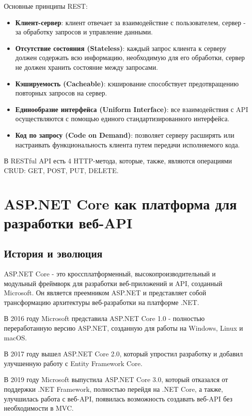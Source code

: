 \documentclass[a4paper,12pt]{report}
\begin{document}
Основные принципы \acs{REST}:
\begin{itemize}
    \item
        \textbf{Клиент-сервер}: клиент отвечает за взаимодействие с пользователем, сервер - за обработку запросов и управление данными.
    \item 
        \textbf{Отсутствие состояния (Stateless)}: каждый запрос клиента к серверу должен содержать всю информацию, необходимую для его обработки, 
        сервер не должен хранить состояние между запросами.
    \item
        \textbf{Кэшируемость (Cacheable)}: кэширование способствует предотвращению повторных запросов на сервер.
    \item
        \textbf{Единообразие интерфейса (Uniform Interface)}: все взаимодействия с API осуществляются с помощью единого стандартизированного интерфейса.
    \item
        \textbf{Код по запросу (Code on Demand)}: позволяет серверу расширять или настраивать функциональность клиента путем передачи исполняемого кода.
\end{itemize}

В \acs{REST}ful \acs{API} есть 4 \acs{HTTP}-метода, которые, также, являются операциями \acs{CRUD}: GET, POST, PUT, DELETE.

\section{ASP.NET Core как платформа для разработки веб-\acs{API}}

\subsection{История и эволюция}
ASP.NET Core - это кроссплатформенный, высокопроизводительный и модульный фреймворк для разработки веб-приложений и \acs{API}, созданный Microsoft. 
Он является преемником ASP.NET и представляет собой трансформацию архитектуры веб-разработки на платформе .NET.

В 2016 году Microsoft представила ASP.NET Core 1.0 - полностью переработанную версию ASP.NET, созданную для работы на Windows, Linux и macOS.\cite{announcing_asp_net_core_1_0}

В 2017 году вышел ASP.NET Core 2.0, который упростил разработку и добавил улучшенную работу с Entity Framework Core.\cite{announcing_asp_net_core_2_0}

В 2019 году Microsoft выпустила ASP.NET Core 3.0, который отказался от поддержки .NET Framework, полностью перейдя на .NET Core, 
а также, улучшилась работа с веб-\acs{API}, появилась возможность создавать веб-\acs{API} без необходимости в \acs{MVC}.\cite{announcing_asp_net_core_3_0}
\end{document}
